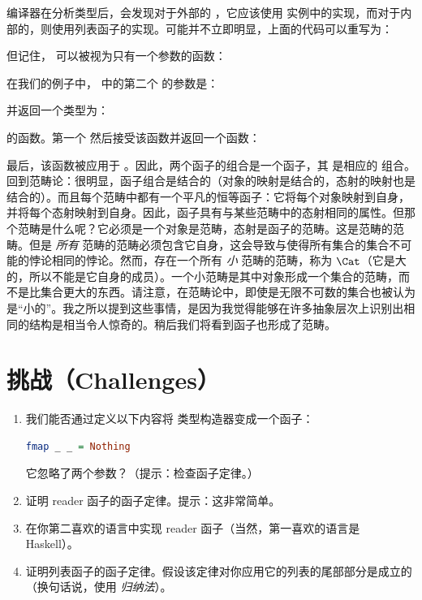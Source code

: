 编译器在分析类型后，会发现对于外部的 ，它应该使用  实例中的实现，而对于内部的，则使用列表函子的实现。可能并不立即明显，上面的代码可以重写为：

但记住， 可以被视为只有一个参数的函数：

在我们的例子中， 中的第二个  的参数是：

并返回一个类型为：

的函数。第一个  然后接受该函数并返回一个函数：

最后，该函数被应用于 。因此，两个函子的组合是一个函子，其  是相应的  组合。回到范畴论：很明显，函子组合是结合的（对象的映射是结合的，态射的映射也是结合的）。而且每个范畴中都有一个平凡的恒等函子：它将每个对象映射到自身，并将每个态射映射到自身。因此，函子具有与某些范畴中的态射相同的属性。但那个范畴是什么呢？它必须是一个对象是范畴，态射是函子的范畴。这是范畴的范畴。但是 \emph{所有} 范畴的范畴必须包含它自身，这会导致与使得所有集合的集合不可能的悖论相同的悖论。然而，存在一个所有 \emph{小} 范畴的范畴，称为 $\Cat$（它是大的，所以不能是它自身的成员）。一个小范畴是其中对象形成一个集合的范畴，而不是比集合更大的东西。请注意，在范畴论中，即使是无限不可数的集合也被认为是“小的”。我之所以提到这些事情，是因为我觉得能够在许多抽象层次上识别出相同的结构是相当令人惊奇的。稍后我们将看到函子也形成了范畴。

\section{挑战（Challenges）}

\begin{enumerate}
  \tightlist
  \item
  我们能否通过定义以下内容将  类型构造器变成一个函子：

  \begin{lstlisting}[language=Haskell]
    fmap _ _ = Nothing
  \end{lstlisting}

  它忽略了两个参数？（提示：检查函子定律。）
  \item
  证明 reader 函子的函子定律。提示：这非常简单。
  \item
  在你第二喜欢的语言中实现 reader 函子（当然，第一喜欢的语言是 Haskell）。
  \item
  证明列表函子的函子定律。假设该定律对你应用它的列表的尾部部分是成立的（换句话说，使用 \emph{归纳法}）。
\end{enumerate}

